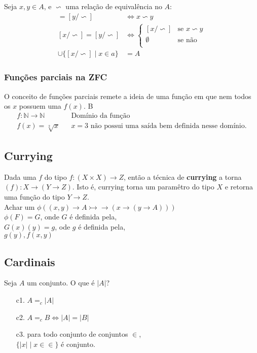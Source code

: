\documentclass[12pt, a4paper]{article}
\begin{document}
Seja $x,y \in A$, e $\backsim$ uma relação de equivalência no $A$:
\begin{align*}
[x/\backsim] = [y/\backsim] &\iff x \backsim y\\
[x/\backsim] = [y/\backsim] &\iff
\begin{cases}
[x/\backsim] 	& \text{se } x \backsim y \\
\emptyset 		& \text{se não}\\
\end{cases}
\\
\cup\{[x/ \backsim] \mid x \in a \} &= A
\end{align*}

\subsubsection{Funções parciais na ZFC}
O conceito de funções parciais remete a ideia de uma função em que nem todos os $x$ possuem uma $f(x)$. B
\begin{align*}
f: \mathbb{N} \to \mathbb{N} && \text{Domínio da função}\\
f(x) = \sqrt[2]{x} && x = 3 \text{ não possui uma saída bem definida nesse domínio.}
\end{align*}

\subsection{Currying}
Dada uma $f$ do tipo $f:(X \times X) \rightarrow Z$, então a técnica de \textbf{currying} a torna $(f): X \rightarrow (Y \rightarrow Z)$.
Isto é, currying torna um paramêtro do tipo $X$ e retorna uma função do tipo $Y \rightarrow Z$.\\


\noindent Achar um $\phi ( (x,y) \rightarrow A \rightarrowtail\!\!\!\!\!\rightarrow (x \rightarrow (y \rightarrow A)))$\\
$\phi(F) = G$, onde $G$ é definida pela,\\
$G(x)(y) = g$, ode $g$ é definida pela,\\
$g(y), f(x,y)$

\subsection{Cardinais}
Seja $A$ um conjunto. O que é $|A|$?
\begin{itemize}
\item[c1.] $A =_c |A|$
\item[c2.] $A =_c B \iff |A| = |B|$
\item[c3.] para todo conjunto de conjuntos $\in$,\\
$\{|x| \mid x \in \in \}$ é conjunto.
\end{itemize}
\end{document}
